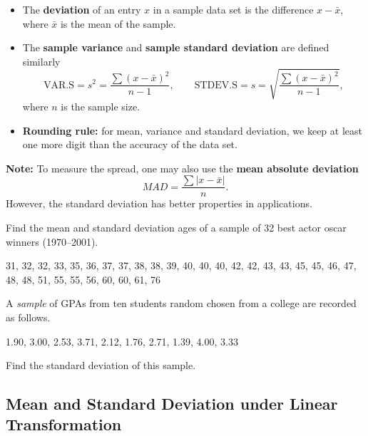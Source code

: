 \begin{itemize}
\item
  The \textbf{deviation} of an entry \(x\) in a sample data set is the
  difference \(x-\bar{x}\), where \(\bar{x}\) is the mean of the sample.
\item
  The \textbf{sample variance} and \textbf{sample standard deviation}
  are defined similarly \[
    \text{VAR.S}=s^2=\dfrac{\sum(x-\bar{x})^2}{n-1}, \qquad
    \text{STDEV.S}=s=\sqrt{\dfrac{\sum(x-\bar{x})^2}{n-1}},
  \] where \(n\) is the sample size.
\item
  \textbf{Rounding rule:} for mean, variance and standard deviation, we
  keep at least one more digit than the accuracy of the data set.
\end{itemize}

\textbf{Note:} To measure the spread, one may also use the \textbf{mean
absolute deviation} \[MAD=\dfrac{\sum |x-\bar{x}|}{n}.\] However, the
standard deviation has better properties in applications.

\begin{example}

Find the mean and standard deviation ages of a sample of 32 best actor
oscar winners (1970--2001).

31, 32, 32, 33, 35, 36, 37, 37, 38, 38, 39, 40, 40, 40, 42, 42, 43, 43,
45, 45, 46, 47, 48, 48, 51, 55, 55, 56, 60, 60, 61, 76

\end{example}
\vspace*{6\baselineskip}

\begin{exercise}

A \emph{sample} of GPAs from ten students random chosen from a college
are recorded as follows.

1.90, 3.00, 2.53, 3.71, 2.12, 1.76, 2.71, 1.39, 4.00, 3.33

Find the standard deviation of this sample.

\end{exercise}
\vspace*{6\baselineskip}

\hypertarget{mean-and-standard-deviation-under-linear-transformation}{%
\subsection{Mean and Standard Deviation under Linear
Transformation}\label{mean-and-standard-deviation-under-linear-transformation}}

